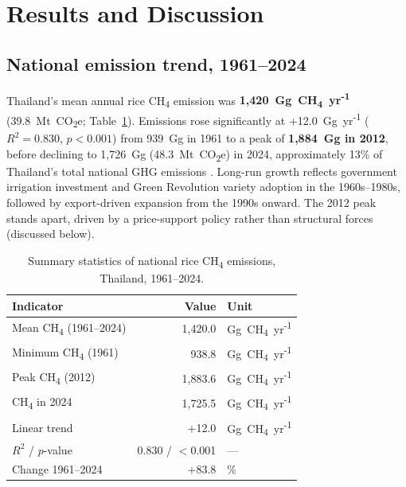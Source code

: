 \documentclass[fleqn,10pt]{olplainarticle}
\begin{document}
\section*{Results and Discussion}

\subsection*{National emission trend, 1961--2024}

Thailand's mean annual rice CH\textsubscript{4} emission was
\textbf{1,420~Gg~CH\textsubscript{4}~yr\textsuperscript{-1}}
(39.8~Mt~CO\textsubscript{2}e; Table~\ref{tab:national}).
Emissions rose significantly at +12.0~Gg~yr\textsuperscript{-1}
($R^2 = 0.830$, $p < 0.001$) from 939~Gg in 1961 to a peak of
\textbf{1,884~Gg in 2012}, before declining to 1,726~Gg (48.3~Mt~CO\textsubscript{2}e)
in 2024, approximately 13\% of Thailand's total national GHG emissions
\citep{tgo2022}.
Long-run growth reflects government irrigation investment and Green Revolution
variety adoption in the 1960s--1980s, followed by export-driven expansion
from the 1990s onward.
The 2012 peak stands apart, driven by a price-support policy rather than
structural forces (discussed below).

\begin{table}[!htbp]
\centering
\caption{Summary statistics of national rice CH\textsubscript{4} emissions,
         Thailand, 1961--2024.}
\label{tab:national}
\begin{tabular}{@{}lrl@{}}
\toprule
\textbf{Indicator} & \textbf{Value} & \textbf{Unit} \\
\midrule
Mean CH\textsubscript{4} (1961--2024) & 1,420.0 & Gg~CH\textsubscript{4}~yr\textsuperscript{-1} \\
Minimum CH\textsubscript{4} (1961)    & 938.8   & Gg~CH\textsubscript{4}~yr\textsuperscript{-1} \\
Peak CH\textsubscript{4} (2012)       & 1,883.6 & Gg~CH\textsubscript{4}~yr\textsuperscript{-1} \\
CH\textsubscript{4} in 2024           & 1,725.5 & Gg~CH\textsubscript{4}~yr\textsuperscript{-1} \\
Linear trend                          & +12.0   & Gg~CH\textsubscript{4}~yr\textsuperscript{-1} \\
$R^2$ / $p$-value                     & 0.830 / $<$0.001 & --- \\
Change 1961--2024                     & +83.8   & \% \\
\bottomrule
\end{tabular}
\end{table}
\end{document}
